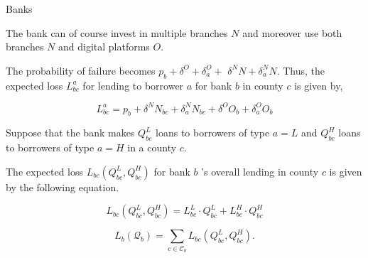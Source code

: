\documentclass[notes,10pt, aspectratio=169]{beamer}
\newenvironment{wideitemize}{\itemize\addtolength{\itemsep}{10pt}}{\enditemize}
\begin{document}
\begin{frame}{Banks}


    \begin{wideitemize}
        \item The bank can of course invest in multiple branches $N$ and moreover use both branches $N$ and digital platforms $O$. 
        \item The probability of failure becomes $p_b+\delta^O+\delta_a^O+$ $\delta^N N+\delta_a^N N$. Thus, the expected loss $L_{b c}^a$ for lending to borrower $a$ for bank $b$ in county $c$ is given by,

        $$
 L_{b c}^a=p_b+\delta^N N_{b c}+\delta_a^N N_{b c}+\delta^O O_b+\delta_a^O O_b
        $$
        
        
        \item Suppose that the bank makes $Q_{b c}^L$ loans to borrowers of type $a=L$ and $Q_{b c}^H$ loans to borrowers of type $a=H$ in a county $c$. 
        
        \item The expected loss $L_{b c}\left(Q_{b c}^L, Q_{b c}^H\right)$ for bank $b$ 's overall lending in county $c$ is given by the following equation.
        
        $$
 L_{b c}\left(Q_{b c}^L, Q_{b c}^H\right)=L_{b c}^L \cdot Q_{b c}^L+L_{b c}^H \cdot Q_{b c}^H
        $$
        
        
        
        $$
 L_b\left(\mathcal{Q}_b\right)=\sum_{c \in \mathcal{C}_b} L_{b c}\left(Q_{b c}^L, Q_{b c}^H\right) .
        $$
        
    \end{wideitemize}


\end{frame}
\end{document}
